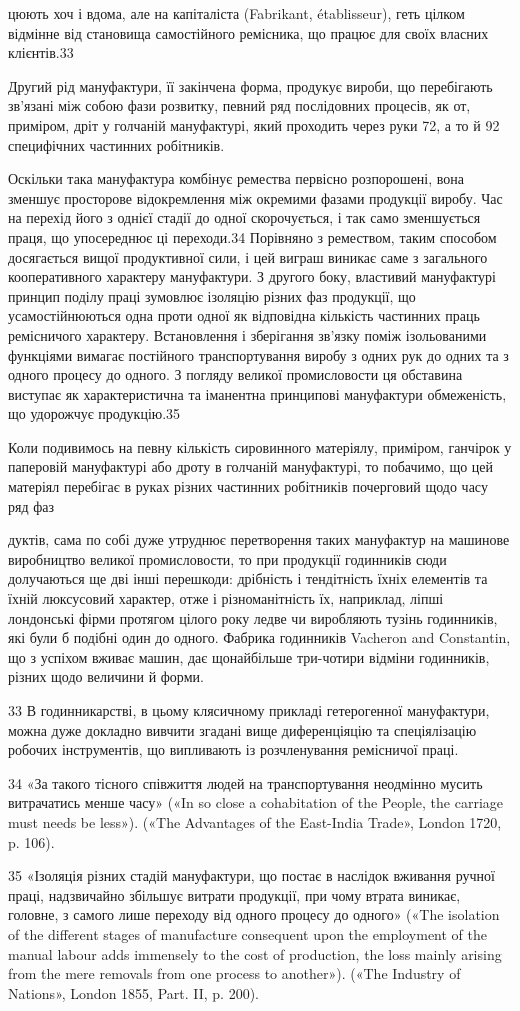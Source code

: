 цюють хоч і вдома, але на капіталіста (Fabrikant, établisseur),
геть цілком відмінне від становища самостійного ремісника, що
працює для своїх власних клієнтів.33

Другий рід мануфактури, її закінчена форма, продукує
вироби, що перебігають зв’язані між собою фази розвитку, певний
ряд послідовних процесів, як от, приміром, дріт у голчаній
мануфактурі, який проходить через руки 72, а то й 92 специфічних
частинних робітників.

Оскільки така мануфактура комбінує ремества первісно розпорошені,
вона зменшує просторове відокремлення між окремими
фазами продукції виробу. Час на перехід його з однієї
стадії до одної скорочується, і так само зменшується праця, що
упосереднює ці переходи.34 Порівняно з ремеством, таким способом
досягається вищої продуктивної сили, і цей виграш виникає
саме з загального кооперативного характеру мануфактури.
З другого боку, властивий мануфактурі принцип поділу праці
зумовлює ізоляцію різних фаз продукції, що усамостійнюються
одна проти одної як відповідна кількість частинних праць ремісничого
характеру. Встановлення і зберігання зв’язку поміж
ізольованими функціями вимагає постійного транспортування
виробу з одних рук до одних та з одного процесу до одного.
З погляду великої промисловости ця обставина виступає як характеристична
та іманентна принципові мануфактури обмеженість,
що удорожчує продукцію.35

Коли подивимось на певну кількість сировинного матеріялу,
приміром, ганчірок у паперовій мануфактурі або дроту в голчаній
мануфактурі, то побачимо, що цей матеріял перебігає в руках
різних частинних робітників почерговий щодо часу ряд фаз

дуктів, сама по собі дуже утруднює перетворення таких мануфактур на
машинове виробництво великої промисловости, то при продукції годинників
сюди долучаються ще дві інші перешкоди: дрібність і тендітність
їхніх елементів та їхній люксусовий характер, отже і різноманітність їх,
наприклад, ліпші лондонські фірми протягом цілого року ледве чи виробляють
тузінь годинників, які були б подібні один до одного. Фабрика
годинників Vacheron and Constantin, що з успіхом вживає машин,
дає щонайбільше три-чотири відміни годинників, різних щодо величини
й форми.

33 В годинникарстві, в цьому клясичному прикладі гетерогенної
мануфактури, можна дуже докладно вивчити згадані вище диференціяцію
та спеціялізацію робочих інструментів, що випливають із розчленування
ремісничої праці.

34 «За такого тісного співжиття людей на транспортування неодмінно
мусить витрачатись менше часу» («In so close a cohabitation
of the People, the carriage must needs be less»). («The Advantages of the
East-India Trade», London 1720, p. 106).

35 «Ізоляція різних стадій мануфактури, що постає в наслідок вживання
ручної праці, надзвичайно збільшує витрати продукції, при чому
втрата виникає, головне, з самого лише переходу від одного процесу
до одного» («The isolation of the different stages of manufacture consequent
upon the employment of the manual labour adds immensely to
the cost of production, the loss mainly arising from the mere removals from
one process to another»). («The Industry of Nations», London 1855,
Part. II, p. 200).
